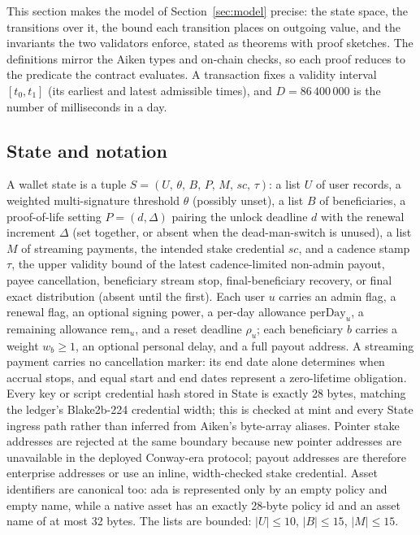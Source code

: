 \documentclass[11pt,DIV=11,parskip=half-]{scrartcl}
\begin{document}
This section makes the model of Section~\ref{sec:model} precise: the state space, the transitions over it, the bound each transition places on outgoing value, and the invariants the two validators enforce, stated as theorems with proof sketches. The definitions mirror the Aiken types and on-chain checks, so each proof reduces to the predicate the contract evaluates. A transaction fixes a validity interval $[t_0, t_1]$ (its earliest and latest admissible times), and $D = 86\,400\,000$ is the number of milliseconds in a day.

\subsection{State and notation}
\begin{definition}
A wallet state is a tuple $S = (U,\, \theta,\, B,\, P,\, M,\, \mathit{sc},\, \tau)$: a list $U$ of user records, a weighted multi-signature threshold $\theta$ (possibly unset), a list $B$ of beneficiaries, a proof-of-life setting $P = (d, \Delta)$ pairing the unlock deadline $d$ with the renewal increment $\Delta$ (set together, or absent when the dead-man-switch is unused), a list $M$ of streaming payments, the intended stake credential $\mathit{sc}$, and a cadence stamp $\tau$, the upper validity bound of the latest cadence-limited non-admin payout, payee cancellation, beneficiary stream stop, final-beneficiary recovery, or final exact distribution (absent until the first). Each user $u$ carries an admin flag, a renewal flag, an optional signing power, a per-day allowance $\mathrm{perDay}_u$, a remaining allowance $\mathrm{rem}_u$, and a reset deadline $\rho_u$; each beneficiary $b$ carries a weight $w_b \ge 1$, an optional personal delay, and a full payout address. A streaming payment carries no cancellation marker: its end date alone determines when accrual stops, and equal start and end dates represent a zero-lifetime obligation. Every key or script credential hash stored in State is exactly 28 bytes, matching the ledger's Blake2b-224 credential width; this is checked at mint and every State ingress path rather than inferred from Aiken's byte-array aliases. Pointer stake addresses are rejected at the same boundary because new pointer addresses are unavailable in the deployed Conway-era protocol; payout addresses are therefore enterprise addresses or use an inline, width-checked stake credential. Asset identifiers are canonical too: ada is represented only by an empty policy and empty name, while a native asset has an exactly 28-byte policy id and an asset name of at most 32 bytes. The lists are bounded: $|U| \le 10$, $|B| \le 15$, $|M| \le 15$.
\end{definition}
\end{document}
